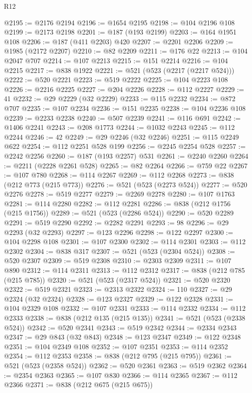 \begin{lexlean}{R12}
\begin{coremodule}
@2195 := @2176 @2194
@2196 := @1654 @2195
@2198 := @104 @2196 @108
@2199 := @2173 @2198
@2201 := @187 (@193 @2199)
@2203 := @164 @1951 @108
@2206 := @187 (@411 @2203) @420
@2207 := @2201 @2206
@2209 := @1985 (@2172 @2207)
@2210 := @82 @2209
@2211 := @176 @22
@2213 := @104 @2047 @707
@2214 := @107 @2213
@2215 := @151 @2214
@2216 := @104 @2215
@2217 := @838 @1922
@2221 := @521 (@523 (@2217 (@2217 @524)))
@2222 := @520 @2221
@2223 := @519 @2222
@2225 := @104 @2223 @108
@2226 := @2216 @2225
@2227 := @204 @2226
@2228 := @112 @2227
@2229 := 41
@2232 := @29 @2229 (@32 @2229)
@2233 := @115 @2232
@2234 := @872 @707
@2235 := @107 @2234
@2236 := @151 @2235
@2238 := @104 @2236 @108
@2239 := @2233 @2238
@2240 := @507 @2239
@2241 := @116 @691
@2242 := @1406 @2241
@2243 := @208 @1773
@2244 := @1032 @2243
@2245 := @112 @2244
@2246 := 42
@2249 := @29 @2246 (@32 @2246)
@2251 := @115 @2249 @622
@2254 := @112 @2251 @528 @199
@2256 := @2245 @2254 @528
@2257 := @2242 @2256
@2260 := @187 (@193 @2257) @531
@2261 := @2240 @2260
@2264 := @2211 (@2228 @2261 @528)
@2265 := @82 @2264
@2266 := @759 @22
@2267 := @107 @780
@2268 := @114 @2267
@2269 := @112 @2268
@2273 := @838 (@212 @773 (@215 @773))
@2276 := @521 (@523 (@2273 @524))
@2277 := @520 @2276
@2278 := @519 @2277
@2279 := @2269 @2278
@2280 := @107 @1763
@2281 := @114 @2280
@2282 := @112 @2281
@2286 := @838 (@212 @1756 (@215 @1756))
@2289 := @521 (@523 (@2286 @524))
@2290 := @520 @2289
@2291 := @519 @2290
@2292 := @2282 @2291
@2293 := 98
@2296 := @29 @2293 (@32 @2293)
@2297 := @123 @2296
@2298 := @122 @2297
@2300 := @104 @2298 @108
@2301 := @107 @2300
@2302 := @114 @2301
@2303 := @112 @2302
@2304 := @838 @317
@2307 := @521 (@523 (@2304 @524))
@2308 := @520 @2307
@2309 := @519 @2308
@2310 := @2303 @2309
@2311 := @107 @890
@2312 := @114 @2311
@2313 := @112 @2312
@2317 := @838 (@212 @785 (@215 @785))
@2320 := @521 (@523 (@2317 @524))
@2321 := @520 @2320
@2322 := @519 @2321
@2323 := @2313 @2322
@2324 := 110
@2327 := @29 @2324 (@32 @2324)
@2328 := @123 @2327
@2329 := @122 @2328
@2331 := @104 @2329 @108
@2332 := @107 @2331
@2333 := @114 @2332
@2334 := @112 @2333
@2338 := @838 (@212 @135 (@215 @135))
@2341 := @521 (@523 (@2338 @524))
@2342 := @520 @2341
@2343 := @519 @2342
@2344 := @2334 @2343
@2347 := @29 @843 (@32 @843)
@2348 := @123 @2347
@2349 := @122 @2348
@2351 := @104 @2349 @108
@2352 := @107 @2351
@2353 := @114 @2352
@2354 := @112 @2353
@2358 := @838 (@212 @795 (@215 @795))
@2361 := @521 (@523 (@2358 @524))
@2362 := @520 @2361
@2363 := @519 @2362
@2364 := @2354 @2363
@2365 := @107 @830
@2366 := @114 @2365
@2367 := @112 @2366
@2371 := @838 (@212 @675 (@215 @675))

\end{coremodule}
\end{lexlean}
